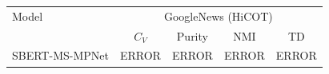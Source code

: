\begin{tabular}{lcccc}
\toprule
Model & \multicolumn{4}{c}{GoogleNews (HiCOT)} \\
 & $C_V$ & Purity & NMI & TD \\
\midrule
SBERT-MS-MPNet & ERROR & ERROR & ERROR & ERROR \\
\bottomrule
\end{tabular}
